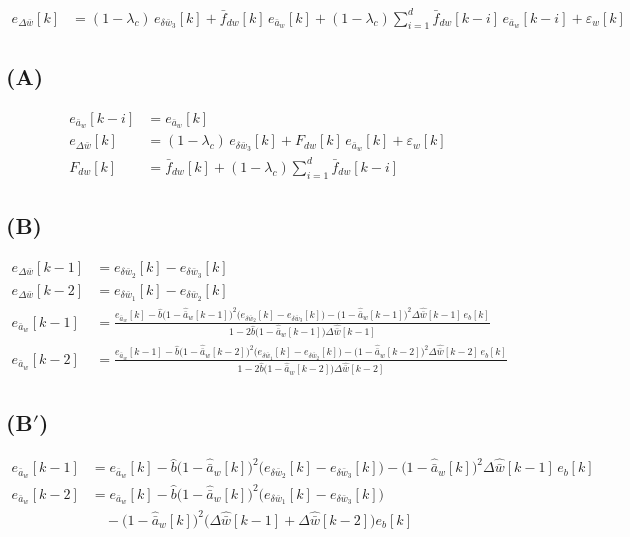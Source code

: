 \documentclass[11pt,a4paper,fontset=none]{ctexart}
\newcommand{\ba}{\bar{a}}
\newcommand{\bw}{\bar{w}}
\newcommand{\dWh}{\Delta\hat{\bw}}
\newcommand{\eD}{e_{\Delta\bw}}
\newcommand{\ah}{\hat{\ba}_w}
\newcommand{\bh}{\hat{b}}
\newcommand{\fd}{\bar f_{dw}}
\newcommand{\ea}{e_{\ba_w}}
\begin{document}
\begin{align*}
\eD[k] &= (1-\lambda_c)\,e_{\delta\bw_3}[k] + \fd[k]\,\ea[k] + (1-\lambda_c)\sum_{i=1}^{d}\fd[k-i]\,\ea[k-i] + \varepsilon_w[k] \tag{7}
\end{align*}

\subsection*{(A)}

\begin{align*}
\ea[k-i]  &= \ea[k] \\
\eD[k]    &= (1-\lambda_c)\,e_{\delta\bw_3}[k] + F_{dw}[k]\,\ea[k] + \varepsilon_w[k] \\
F_{dw}[k] &= \fd[k] + (1-\lambda_c)\sum_{i=1}^{d}\fd[k-i]
\end{align*}

\subsection*{(B)}

\begin{align*}
\eD[k-1] &= e_{\delta\bw_2}[k] - e_{\delta\bw_3}[k] \\
\eD[k-2] &= e_{\delta\bw_1}[k] - e_{\delta\bw_2}[k] \\[6pt]
\ea[k-1] &= \frac{\ea[k] - \bh\bigl(1-\ah[k-1]\bigr)^{2}\bigl(e_{\delta\bw_2}[k] - e_{\delta\bw_3}[k]\bigr)
            - \bigl(1-\ah[k-1]\bigr)^{2}\dWh[k-1]\,e_b[k]}{1 - 2\bh\bigl(1-\ah[k-1]\bigr)\dWh[k-1]} \tag{8} \\[8pt]
\ea[k-2] &= \frac{\ea[k-1] - \bh\bigl(1-\ah[k-2]\bigr)^{2}\bigl(e_{\delta\bw_1}[k] - e_{\delta\bw_2}[k]\bigr)
            - \bigl(1-\ah[k-2]\bigr)^{2}\dWh[k-2]\,e_b[k]}{1 - 2\bh\bigl(1-\ah[k-2]\bigr)\dWh[k-2]} \tag{9}
\end{align*}

\subsection*{(B$'$)}

\begin{align*}
\ea[k-1] &= \ea[k] - \bh\bigl(1-\ah[k]\bigr)^{2}\bigl(e_{\delta\bw_2}[k] - e_{\delta\bw_3}[k]\bigr)
            - \bigl(1-\ah[k]\bigr)^{2}\dWh[k-1]\,e_b[k] \tag{8$'$} \\
\ea[k-2] &= \ea[k] - \bh\bigl(1-\ah[k]\bigr)^{2}\bigl(e_{\delta\bw_1}[k] - e_{\delta\bw_3}[k]\bigr) \\
         &\quad - \bigl(1-\ah[k]\bigr)^{2}\bigl(\dWh[k-1] + \dWh[k-2]\bigr)e_b[k] \tag{9$'$}
\end{align*}
\end{document}
